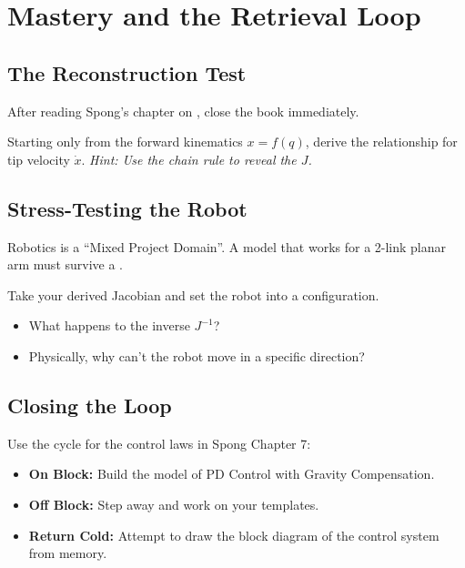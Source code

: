 \chapter{Mastery and the Retrieval Loop}


\section{The Reconstruction Test}

After reading Spong's chapter on , close the book immediately.

\begin{practice}
    Starting only from the forward kinematics \(x = f(q)\), derive the relationship for tip velocity \(\dot{x}\).
    \textit{Hint: Use the chain rule to reveal the  \(J\).}
\end{practice}

\section{Stress-Testing the Robot}

Robotics is a ``Mixed Project Domain''. A model that works for a 2-link planar arm must survive a .

\begin{designrule}
    Take your derived Jacobian and set the robot into a  configuration.
    \begin{itemize}
        \item What happens to the inverse \(J^{-1}\)?
        \item Physically, why can't the robot move in a specific direction?
    \end{itemize}
\end{designrule}

\section{Closing the Loop}

Use the  cycle for the control laws in Spong Chapter 7:
\begin{itemize}
    \item \textbf{On Block:} Build the model of PD Control with Gravity Compensation.
    \item \textbf{Off Block:} Step away and work on your  templates.
    \item \textbf{Return Cold:} Attempt to draw the block diagram of the control system from memory.
\end{itemize}


